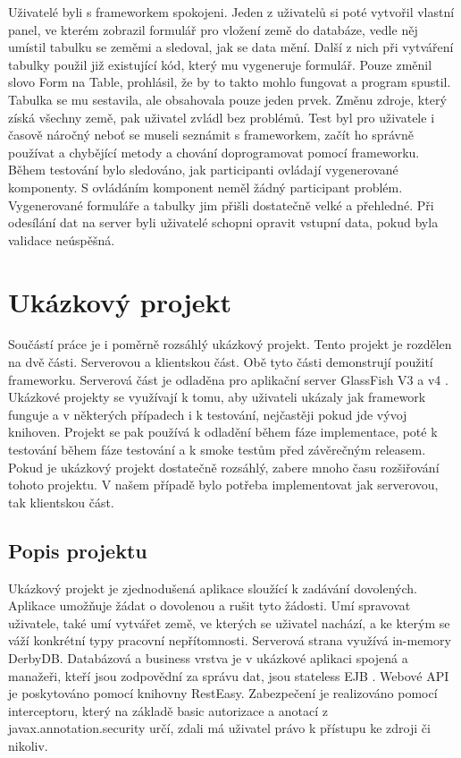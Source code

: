 Uživatelé byli s frameworkem spokojeni. Jeden z uživatelů si poté vytvořil vlastní panel, ve kterém zobrazil formulář pro vložení země do databáze, vedle něj umístil tabulku se zeměmi a sledoval, jak se data mění. Další z nich při vytváření tabulky použil již existující kód, který mu vygeneruje formulář. Pouze změnil slovo Form na Table, prohlásil, že by to takto mohlo fungovat a program spustil. Tabulka se mu sestavila, ale obsahovala pouze jeden prvek. Změnu zdroje, který získá všechny země, pak uživatel zvládl bez problémů. Test byl pro uživatele i časově náročný neboť se museli seznámit s frameworkem, začít ho správně používat a chybějící metody a chování doprogramovat pomocí frameworku. Během testování bylo sledováno, jak participanti ovládají vygenerované komponenty. S ovládáním komponent neměl žádný participant problém. Vygenerované formuláře a tabulky jim přišli dostatečně velké a přehledné. Při odesílání dat na server byli uživatelé schopni opravit vstupní data, pokud byla validace neúspěšná. 

\section{Ukázkový projekt}
Součástí práce je i poměrně rozsáhlý ukázkový projekt. Tento projekt je rozdělen na dvě části. Serverovou a klientskou část. Obě tyto části demonstrují použití frameworku. Serverová část je odladěna pro aplikační server GlassFish V3 a v4 \cite{glassfish}. Ukázkové projekty se využívají k tomu, aby uživateli ukázaly jak framework funguje a v některých případech i k testování, nejčastěji pokud jde vývoj knihoven. Projekt se pak používá k odladění během fáze implementace, poté k testování během fáze testování a k smoke testům před závěrečným releasem. Pokud je ukázkový projekt dostatečně rozsáhlý, zabere mnoho času rozšiřování tohoto projektu. V našem případě bylo potřeba implementovat jak serverovou, tak klientskou část.
\subsection{Popis projektu}
Ukázkový projekt je zjednodušená aplikace sloužící k zadávání dovolených. Aplikace umožňuje žádat o dovolenou a rušit tyto žádosti. Umí spravovat uživatele, také umí vytvářet země, ve kterých se uživatel nachází, a ke kterým se váží konkrétní typy pracovní nepřítomnosti. Serverová strana využívá in-memory DerbyDB. Databázová a business vrstva je v ukázkové aplikaci spojená a manažeři, kteří jsou zodpovědní za správu dat, jsou stateless EJB \cite{javaEE}. Webové API je poskytováno pomocí knihovny RestEasy. Zabezpečení je realizováno pomocí interceptoru, který na základě basic autorizace a anotací z javax.annotation.security určí, zdali má uživatel právo k přístupu ke zdroji či nikoliv.

